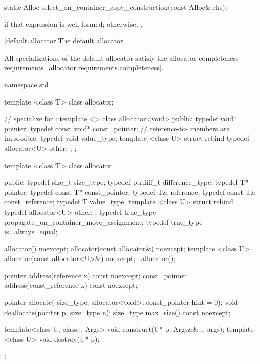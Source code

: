 %
%
\begin{itemdecl}
static Alloc select_on_container_copy_construction(const Alloc& rhs);
\end{itemdecl}

\begin{itemdescr}
\pnum
\returns {} if that expression is
well-formed; otherwise, .
\end{itemdescr}

[default.allocator]{The default allocator}

\pnum
All specializations of the default allocator satisfy the
allocator completeness requirements~\ref{allocator.requirements.completeness}.

%
\begin{codeblock}
namespace std {
  template <class T> class allocator;

  // specialize for :
  template <> class allocator<void> {
  public:
    typedef void*   pointer;
    typedef const void* const_pointer;
    // reference-to- members are impossible.
    typedef void  value_type;
    template <class U> struct rebind { typedef allocator<U> other; };
  };

  template <class T> class allocator {
   public:
    typedef size_t    size_type;
    typedef ptrdiff_t difference_type;
    typedef T*        pointer;
    typedef const T*  const_pointer;
    typedef T&        reference;
    typedef const T&  const_reference;
    typedef T         value_type;
    template <class U> struct rebind { typedef allocator<U> other; };
    typedef true_type propagate_on_container_move_assignment;
    typedef true_type is_always_equal;

    allocator() noexcept;
    allocator(const allocator&) noexcept;
    template <class U> allocator(const allocator<U>&) noexcept;
   ~allocator();

    pointer address(reference x) const noexcept;
    const_pointer address(const_reference x) const noexcept;

    pointer allocate(
      size_type, allocator<void>::const_pointer hint = 0);
    void deallocate(pointer p, size_type n);
    size_type max_size() const noexcept;

    template<class U, class... Args>
      void construct(U* p, Args&&... args);
    template <class U>
      void destroy(U* p);
  };
}
\end{codeblock}

